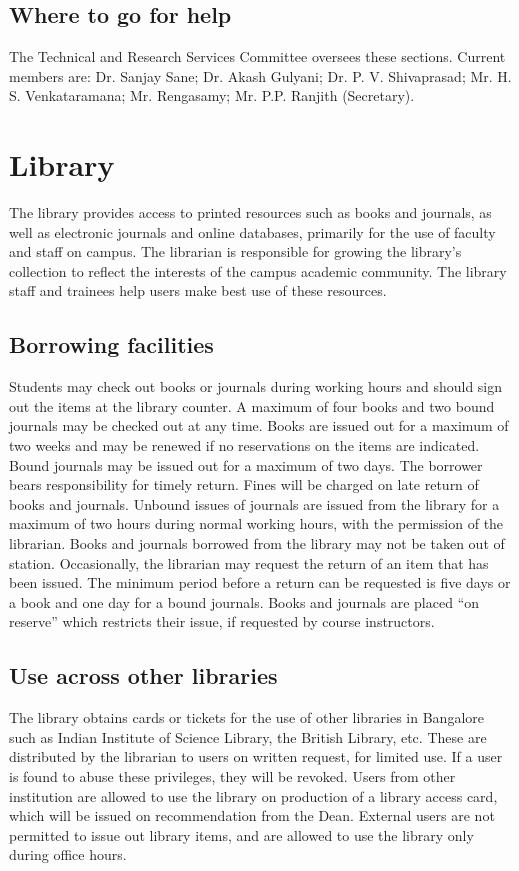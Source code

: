 \documentclass[a4paper]{extarticle}
\begin{document}
\subsection{Where to go for help}
The Technical and Research Services Committee oversees these sections. Current members
are: Dr. Sanjay Sane; Dr. Akash Gulyani; Dr. P. V. Shivaprasad; Mr. H. S. Venkataramana;
Mr. Rengasamy; Mr. P.P. Ranjith (Secretary).
	
\section{Library}
The library provides access to printed resources such as books and journals, as well as
electronic journals and online databases, primarily for the use of faculty and staff on
campus. The librarian is responsible for growing the library’s collection to reflect the
interests of the campus academic community. The library staff and trainees help users make
best use of these resources.

\subsection{Borrowing facilities}
Students may check out books or journals during working hours and
should sign out the items at the library counter. A maximum of four books and two bound
journals may be checked out at any time. Books are issued out for a maximum of two weeks
and may be renewed if no reservations on the items are indicated. Bound journals may be
issued out for a maximum of two days. The borrower bears responsibility for timely return.
Fines will be charged on late return of books and journals. Unbound issues of journals are
issued from the library for a maximum of two hours during normal working hours, with the
permission of the librarian. Books and journals borrowed from the library may not be taken
out of station. Occasionally, the librarian may request the return of an item that has been
issued. The minimum period before a return can be requested is five days or a book and one
day for a bound journals. Books and journals are placed “on reserve” which restricts their
issue, if requested by course instructors.

\subsection{Use across other libraries}
The library obtains cards or tickets for the use of other libraries
in Bangalore such as Indian Institute of Science Library, the British Library, etc. These are
distributed by the librarian to users on written request, for limited use. If a user is found to
abuse these privileges, they will be revoked. Users from other institution are allowed to use
the library on production of a library access card, which will be issued on recommendation
from the Dean. External users are not permitted to issue out library items, and are allowed to
use the library only during office hours.
\end{document}
